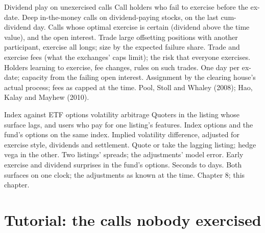 \begin{strategyfile}{Dividend play on unexercised calls}\label{strat:hf:options-cross-venue-and-volatility-arbitrage-at-speed:dividend}
 Call holders who fail to exercise before the ex-date.
 Deep in-the-money calls on dividend-paying stocks, on the last cum-dividend day.
 Calls whose optimal exercise is certain (dividend above the time value), and the open interest.
 Trade large offsetting positions with another participant, exercise all longs; size by the expected failure share.
 Trade and exercise fees (what the exchanges' caps limit); the risk that everyone exercises.
 Holders learning to exercise, fee changes, rules on such trades.
 One day per ex-date; capacity from the failing open interest.
 Assignment by the clearing house's actual process; fees as capped at the time.
 Pool, Stoll and Whaley (2008); Hao, Kalay and Mayhew (2010).
\end{strategyfile}

\begin{strategyfile}{Index against ETF options volatility arbitrage}\label{strat:hf:options-cross-venue-and-volatility-arbitrage-at-speed:indexetf}
 Quoters in the listing whose surface lags, and users who pay for one listing's features.
 Index options and the fund's options on the same index.
 Implied volatility difference, adjusted for exercise style, dividends and settlement.
 Quote or take the lagging listing; hedge vega in the other.
 Two listings' spreads; the adjustments' model error.
 Early exercise and dividend surprises in the fund's options.
 Seconds to days.
 Both surfaces on one clock; the adjustments as known at the time.
 Chapter 8; this chapter.
\end{strategyfile}

\section{Tutorial: the calls nobody exercised}\label{tut:hf:options-cross-venue-and-volatility-arbitrage-at-speed:tut}

